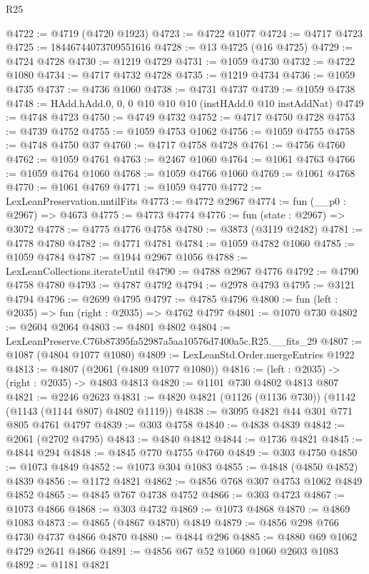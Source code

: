 \begin{lexlean}{R25}
\begin{coremodule}
@4722 := @4719 (@4720 @1923)
@4723 := @4722 @1077
@4724 := @4717 @4723
@4725 := 18446744073709551616
@4728 := @13 @4725 (@16 @4725)
@4729 := @4724 @4728
@4730 := @1219 @4729
@4731 := @1059 @4730
@4732 := @4722 @1080
@4734 := @4717 @4732 @4728
@4735 := @1219 @4734
@4736 := @1059 @4735
@4737 := @4736 @1060
@4738 := @4731 @4737
@4739 := @1059 @4738
@4748 := HAdd.hAdd.{0, 0, 0} @10 @10 @10 (instHAdd.{0} @10 instAddNat)
@4749 := @4748 @4723
@4750 := @4749 @4732
@4752 := @4717 @4750 @4728
@4753 := @4739 @4752
@4755 := @1059 @4753 @1062
@4756 := @1059 @4755
@4758 := @4748 @4750 @37
@4760 := @4717 @4758 @4728
@4761 := @4756 @4760
@4762 := @1059 @4761
@4763 := @2467 @1060
@4764 := @1061 @4763
@4766 := @1059 @4764 @1060
@4768 := @1059 @4766 @1060
@4769 := @1061 @4768
@4770 := @1061 @4769
@4771 := @1059 @4770
@4772 := LexLeanPreservation.untilFits
@4773 := @4772 @2967
@4774 := fun (__p0 : @2967) => @4673
@4775 := @4773 @4774
@4776 := fun (state : @2967) => @3072
@4778 := @4775 @4776 @4758
@4780 := @3873 (@3119 @2482)
@4781 := @4778 @4780
@4782 := @4771 @4781
@4784 := @1059 @4782 @1060
@4785 := @1059 @4784
@4787 := @1944 @2967 @1056
@4788 := LexLeanCollections.iterateUntil
@4790 := @4788 @2967 @4776
@4792 := @4790 @4758 @4780
@4793 := @4787 @4792
@4794 := @2978 @4793
@4795 := @3121 @4794
@4796 := @2699 @4795
@4797 := @4785 @4796
@4800 := fun (left : @2035) => fun (right : @2035) => @4762 @4797
@4801 := @1070 @730
@4802 := @2604 @2064
@4803 := @4801 @4802
@4804 := LexLeanPreserve.C76b87395fa52987a5aa10576d7400a5c.R25.__fits_29
@4807 := @1087 (@4804 @1077 @1080)
@4809 := LexLeanStd.Order.mergeEntries @1922
@4813 := @4807 (@2061 (@4809 @1077 @1080))
@4816 := (left : @2035) -> (right : @2035) -> @4803 @4813
@4820 := @1101 @730 @4802 @4813 @807
@4821 := @2246 @2623
@4831 := @4820 @4821 (@1126 (@1136 @730)) (@1142 (@1143 (@1144 @807) @4802 @1119))
@4838 := @3095 @4821 @44 @301 @771 @805 @4761 @4797
@4839 := @303 @4758
@4840 := @4838 @4839
@4842 := @2061 (@2702 @4795)
@4843 := @4840 @4842
@4844 := @1736 @4821
@4845 := @4844 @294
@4848 := @4845 @770 @4755 @4760
@4849 := @303 @4750
@4850 := @1073 @4849
@4852 := @1073 @304 @1083
@4855 := @4848 (@4850 @4852) @4839
@4856 := @1172 @4821
@4862 := @4856 @768 @307 @4753 @1062 @4849 @4852
@4865 := @4845 @767 @4738 @4752
@4866 := @303 @4723
@4867 := @1073 @4866
@4868 := @303 @4732
@4869 := @1073 @4868
@4870 := @4869 @1083
@4873 := @4865 (@4867 @4870) @4849
@4879 := @4856 @298 @766 @4730 @4737 @4866 @4870
@4880 := @4844 @296
@4885 := @4880 @69 @1062 @4729 @2641 @4866
@4891 := @4856 @67 @52 @1060 @1060 @2603 @1083
@4892 := @1181 @4821

\end{coremodule}
\end{lexlean}
